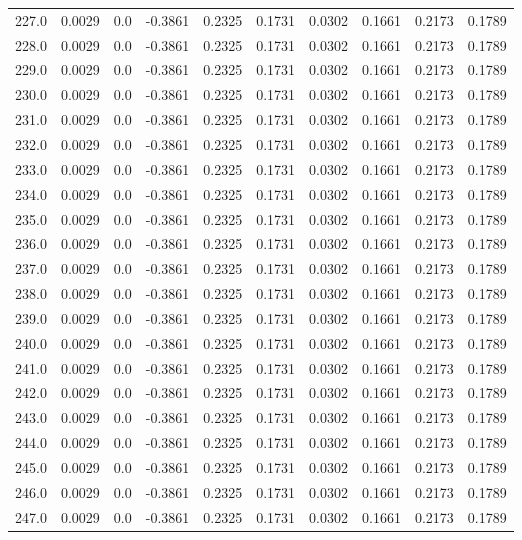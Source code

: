 \begin{longtable}{lrrrrrrrrr}
227.0 & 0.0029 & 0.0 & -0.3861 & 0.2325 & 0.1731 & 0.0302 & 0.1661 & 0.2173 & 0.1789 \\
228.0 & 0.0029 & 0.0 & -0.3861 & 0.2325 & 0.1731 & 0.0302 & 0.1661 & 0.2173 & 0.1789 \\
229.0 & 0.0029 & 0.0 & -0.3861 & 0.2325 & 0.1731 & 0.0302 & 0.1661 & 0.2173 & 0.1789 \\
230.0 & 0.0029 & 0.0 & -0.3861 & 0.2325 & 0.1731 & 0.0302 & 0.1661 & 0.2173 & 0.1789 \\
231.0 & 0.0029 & 0.0 & -0.3861 & 0.2325 & 0.1731 & 0.0302 & 0.1661 & 0.2173 & 0.1789 \\
232.0 & 0.0029 & 0.0 & -0.3861 & 0.2325 & 0.1731 & 0.0302 & 0.1661 & 0.2173 & 0.1789 \\
233.0 & 0.0029 & 0.0 & -0.3861 & 0.2325 & 0.1731 & 0.0302 & 0.1661 & 0.2173 & 0.1789 \\
234.0 & 0.0029 & 0.0 & -0.3861 & 0.2325 & 0.1731 & 0.0302 & 0.1661 & 0.2173 & 0.1789 \\
235.0 & 0.0029 & 0.0 & -0.3861 & 0.2325 & 0.1731 & 0.0302 & 0.1661 & 0.2173 & 0.1789 \\
236.0 & 0.0029 & 0.0 & -0.3861 & 0.2325 & 0.1731 & 0.0302 & 0.1661 & 0.2173 & 0.1789 \\
237.0 & 0.0029 & 0.0 & -0.3861 & 0.2325 & 0.1731 & 0.0302 & 0.1661 & 0.2173 & 0.1789 \\
238.0 & 0.0029 & 0.0 & -0.3861 & 0.2325 & 0.1731 & 0.0302 & 0.1661 & 0.2173 & 0.1789 \\
239.0 & 0.0029 & 0.0 & -0.3861 & 0.2325 & 0.1731 & 0.0302 & 0.1661 & 0.2173 & 0.1789 \\
240.0 & 0.0029 & 0.0 & -0.3861 & 0.2325 & 0.1731 & 0.0302 & 0.1661 & 0.2173 & 0.1789 \\
241.0 & 0.0029 & 0.0 & -0.3861 & 0.2325 & 0.1731 & 0.0302 & 0.1661 & 0.2173 & 0.1789 \\
242.0 & 0.0029 & 0.0 & -0.3861 & 0.2325 & 0.1731 & 0.0302 & 0.1661 & 0.2173 & 0.1789 \\
243.0 & 0.0029 & 0.0 & -0.3861 & 0.2325 & 0.1731 & 0.0302 & 0.1661 & 0.2173 & 0.1789 \\
244.0 & 0.0029 & 0.0 & -0.3861 & 0.2325 & 0.1731 & 0.0302 & 0.1661 & 0.2173 & 0.1789 \\
245.0 & 0.0029 & 0.0 & -0.3861 & 0.2325 & 0.1731 & 0.0302 & 0.1661 & 0.2173 & 0.1789 \\
246.0 & 0.0029 & 0.0 & -0.3861 & 0.2325 & 0.1731 & 0.0302 & 0.1661 & 0.2173 & 0.1789 \\
247.0 & 0.0029 & 0.0 & -0.3861 & 0.2325 & 0.1731 & 0.0302 & 0.1661 & 0.2173 & 0.1789 \\

\end{longtable}
